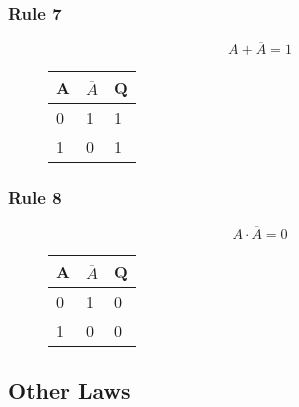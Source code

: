 \subsubsection*{Rule 7}
\begin{figure}[H]
    \begin{minipage}[t]{0.65\textwidth}
        \[A + \overline{A} = 1\]
    \end{minipage}\hfill
    \begin{minipage}[t]{0.25\textwidth}
        \begin{table}[H]
            \begin{tabularx}{0.5\textwidth}{XX|X}
                A & $\overline{A}$ & Q\\
                \hline
                0 & 1 & 1\\
                1 & 0 & 1\\
            \end{tabularx}
        \end{table}
    \end{minipage}\hfill
\end{figure}

\subsubsection*{Rule 8}
\begin{figure}[H]
    \begin{minipage}[t]{0.65\textwidth}
        \[A \cdot \overline{A} = 0\]
    \end{minipage}\hfill
    \begin{minipage}[t]{0.25\textwidth}
        \begin{table}[H]
            \begin{tabularx}{0.5\textwidth}{XX|X}
                A & $\overline{A}$ & Q\\
                \hline
                0 & 1 & 0\\
                1 & 0 & 0\\
            \end{tabularx}
        \end{table}
    \end{minipage}\hfill
\end{figure}

\subsection*{Other Laws}
